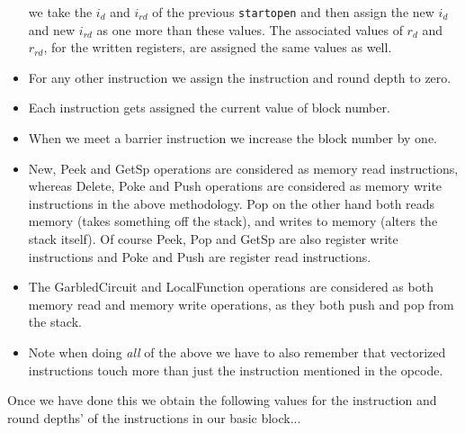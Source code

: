 \begin{itemize}
    we take the $i_d$ and $i_{rd}$ of the previous \verb+startopen+ and then
    assign the new $i_d$ and new $i_{rd}$ as one more than these values.
    The associated values of $r_d$ and $r_{rd}$, for the written registers, are
    assigned the same values as well.
  \item For any other instruction we assign the instruction and round depth to zero.
  \item Each instruction gets assigned the current value of block number.
  \item When we meet a barrier instruction we increase the block number by one.
  \item New, Peek and GetSp operations are considered as memory read instructions, whereas
        Delete, Poke and Push operations are considered as memory write instructions in the above
        methodology.
        Pop on the other hand both reads memory (takes something off the stack),
        and writes to memory (alters the stack itself).
        Of course Peek, Pop and GetSp are also register write instructions and
        Poke and Push are register read instructions.
  \item The GarbledCircuit and LocalFunction operations are considered as both
        memory read and memory write operations, as they both push and pop from
        the stack.
  \item Note when doing {\em all} of the above we have to also remember that vectorized
        instructions touch more than just the instruction mentioned in the opcode.
\end{itemize}
Once we have done this we obtain the following values for the instruction and
round depths' of the instructions in our basic block...
